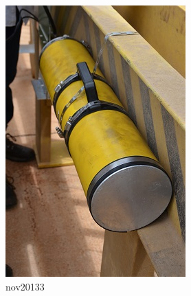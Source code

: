 \begin{figure}[h!]
  \centering
  \includegraphics[width=1\linewidth]{Fotos/Novembro2014/3.jpg}
  \caption{nov20133}
  \label{nov20133}
\end{figure}

